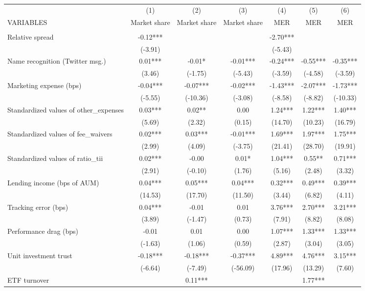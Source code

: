 \documentclass[]{article}
\begin{document}
\begin{tabular}{lcccccc} \hline
 & (1) & (2) & (3) & (4) & (5) & (6) \\
VARIABLES & Market share & Market share & Market share & MER & MER & MER \\ \hline
 &  &  &  &  &  &  \\
Relative spread & -0.12*** &  &  & -2.70*** &  &  \\
 & (-3.91) &  &  & (-5.43) &  &  \\
Name recognition (Twitter msg.) & 0.01*** & -0.01* & -0.01*** & -0.24*** & -0.55*** & -0.35*** \\
 & (3.46) & (-1.75) & (-5.43) & (-3.59) & (-4.58) & (-3.59) \\
Marketing expense (bps) & -0.04*** & -0.07*** & -0.02*** & -1.43*** & -2.07*** & -1.73*** \\
 & (-5.55) & (-10.36) & (-3.08) & (-8.58) & (-8.82) & (-10.33) \\
Standardized values of other\_expenses & 0.03*** & 0.02** & 0.00 & 1.24*** & 1.22*** & 1.40*** \\
 & (5.69) & (2.32) & (0.15) & (14.70) & (10.23) & (16.79) \\
Standardized values of fee\_waivers & 0.02*** & 0.03*** & -0.01*** & 1.69*** & 1.97*** & 1.75*** \\
 & (2.99) & (4.09) & (-3.75) & (21.41) & (28.70) & (19.91) \\
Standardized values of ratio\_tii & 0.02*** & -0.00 & 0.01* & 1.04*** & 0.55** & 0.71*** \\
 & (2.91) & (-0.10) & (1.76) & (5.16) & (2.48) & (3.32) \\
Lending income (bps of AUM) & 0.04*** & 0.05*** & 0.04*** & 0.32*** & 0.49*** & 0.39*** \\
 & (14.53) & (17.70) & (11.50) & (3.44) & (6.82) & (4.11) \\
Tracking error (bps) & 0.04*** & -0.01 & 0.01 & 3.76*** & 2.70*** & 3.21*** \\
 & (3.89) & (-1.47) & (0.73) & (7.91) & (8.82) & (8.08) \\
Performance drag (bps) & -0.01 & 0.01 & 0.00 & 1.07*** & 1.33*** & 1.33*** \\
 & (-1.63) & (1.06) & (0.59) & (2.87) & (3.04) & (3.05) \\
Unit investment trust & -0.18*** & -0.18*** & -0.37*** & 4.89*** & 4.76*** & 3.15*** \\
 & (-6.64) & (-7.49) & (-56.09) & (17.96) & (13.29) & (7.60) \\
ETF turnover &  & 0.11*** &  &  & 1.77*** &  \\

\end{tabular}
\end{document}
